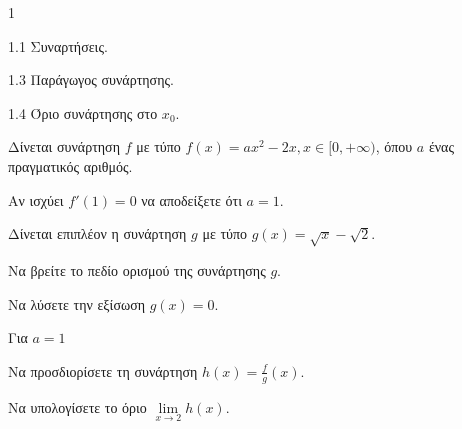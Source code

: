 \begin{ylh}{1}
    \item 1.1 Συναρτήσεις.
    \item 1.3 Παράγωγος συνάρτησης.
    \item 1.4 Όριο συνάρτησης στο $x_0$.
\end{ylh}
Δίνεται συνάρτηση $f$ με τύπο $f(x)=ax^2-2x, x \in [0,+\infty)$, όπου $a$ ένας πραγματικός αριθμός.
\begin{alist}
    \item Αν ισχύει $f'(1)=0$ να αποδείξετε ότι $a=1$. 
    \item Δίνεται επιπλέον η συνάρτηση $g$ με τύπο $g(x)=\sqrt{x}-\sqrt{2}$.
    \begin{rlist}
        \item Να βρείτε το πεδίο ορισμού της συνάρτησης $g$. 
        \item Να λύσετε την εξίσωση $g(x)=0$. 
    \end{rlist}
    \item Για $a=1$
    \begin{rlist}
        \item Να προσδιορίσετε τη συνάρτηση $h(x) = \frac{f}{g}(x)$. 
        \item Να υπολογίσετε το όριο $\lim\limits_{x \to 2} h(x)$. 
    \end{rlist}
\end{alist}


